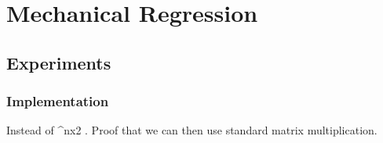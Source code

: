 \section{Mechanical Regression}


\subsection{Experiments}
\subsubsection{Implementation}

Instead of ^{nx2} .
Proof that we can then use standard matrix multiplication.